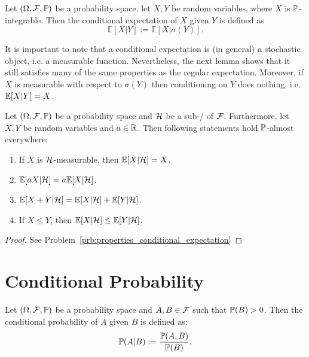 \begin{definition}
Let $(\Omega, \mathcal F, \mathbb P)$ be a probability space, let $X,Y$ be random variables, where $X$ is $\mathbb P$-integrable. Then the conditional expectation of $X$ given $Y$ is defined as
\[
\mathbb{E}[X | Y] := \mathbb{E}[ X | \sigma(Y) ].
\]	
\end{definition}

It is important to note that a conditional expectation is (in general) a stochastic object, i.e. a measurable function. Nevertheless, the next lemma shows that it still satisfies many of the same properties as the regular expectation. Moreover, if $X$ is measurable with respect to $\sigma(Y)$ then conditioning on $Y$ does nothing, i.e. $\mathbb E[X|Y] = X$.

\begin{lemma}\label{lem:properties_conditional_expectation}
Let $(\Omega, \mathcal F, \mathbb P)$ be a probability space and $\mathcal H$ be a sub-\sigalg/ of $\mathcal F$. Furthermore, let $X, Y$ be random variables and $a \in \mathbb R$. Then following statements hold $\mathbb P$-almost everywhere:
\begin{enumerate}[label={(\alph*)}]
\item If $X$ is $\mathcal H$-measurable, then $\mathbb E[X | \mathcal H] = X$.
\item $\mathbb E[a X | \mathcal H] = a \mathbb E[X | \mathcal H]$.
\item $\mathbb E[X + Y | \mathcal H] = \mathbb E[X | \mathcal H] + \mathbb E[Y | \mathcal H]$.
\item If $X \le Y$, then $\mathbb E[X | \mathcal H] \le \mathbb E[Y | \mathcal H]$.
\end{enumerate}
\end{lemma}

\begin{proof}
See Problem~\ref{prb:properties_conditional_expectation}
\end{proof}

\section{Conditional Probability}

\begin{definition}\label{def:conditional_prop_events}
Let $(\Omega, \mathcal F, \mathbb P)$ be a probability space and $A, B \in \mathcal F$ such that $\mathbb P(B) > 0$. Then the conditional probability of $A$ given $B$ is defined as:
\[
	\mathbb P(A|B) := \frac{\mathbb P(A,B)}{\mathbb P(B)}.
\]
\end{definition}




